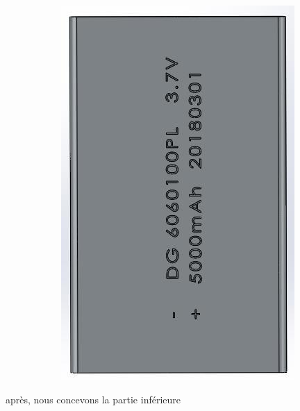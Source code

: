 \begin{figure}[!htbp]
\begin{subfigure}[m]{.3\linewidth}
        \includegraphics[width=\textwidth]{assets/conception1/img143.jpg}
    \end{subfigure}
\end{figure}

\FloatBarrier

après, nous concevons la partie inférieure

